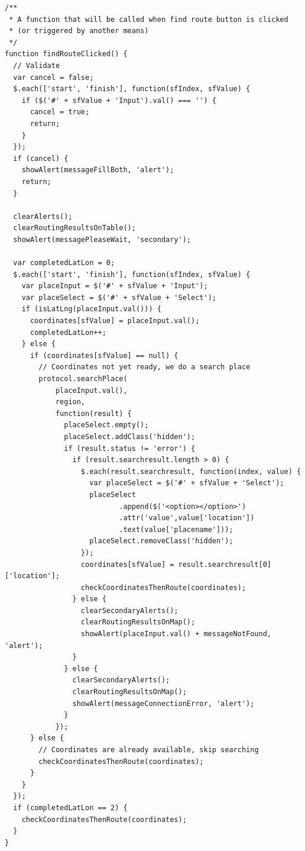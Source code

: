 \documentclass[a4paper,twoside]{article}
\begin{document}
\begin{enumerate}
\begin{lstlisting}[caption=Fungsi JavaScript untuk ketika tombol \textit{find} ditekan,label = {lst_3_php_find_fungsi}]
/**
 * A function that will be called when find route button is clicked
 * (or triggered by another means)
 */
function findRouteClicked() {
  // Validate
  var cancel = false;
  $.each(['start', 'finish'], function(sfIndex, sfValue) {
    if ($('#' + sfValue + 'Input').val() === '') {
      cancel = true;    
      return;
    }
  });
  if (cancel) {
    showAlert(messageFillBoth, 'alert');      
    return;
  }
  
  clearAlerts();
  clearRoutingResultsOnTable();
  showAlert(messagePleaseWait, 'secondary');
  
  var completedLatLon = 0;
  $.each(['start', 'finish'], function(sfIndex, sfValue) {
    var placeInput = $('#' + sfValue + 'Input');
    var placeSelect = $('#' + sfValue + 'Select');
    if (isLatLng(placeInput.val())) {
      coordinates[sfValue] = placeInput.val();
      completedLatLon++;
    } else {
      if (coordinates[sfValue] == null) {
        // Coordinates not yet ready, we do a search place
        protocol.searchPlace(
            placeInput.val(),
            region,
            function(result) {
              placeSelect.empty();
              placeSelect.addClass('hidden');
              if (result.status != 'error') {
                if (result.searchresult.length > 0) {
                  $.each(result.searchresult, function(index, value) {
                    var placeSelect = $('#' + sfValue + 'Select');
                    placeSelect
                           .append($('<option></option>')
                           .attr('value',value['location'])
                           .text(value['placename']));
                    placeSelect.removeClass('hidden');
                  });
                  coordinates[sfValue] = result.searchresult[0]['location'];
                  checkCoordinatesThenRoute(coordinates);
                } else {
                  clearSecondaryAlerts();
                  clearRoutingResultsOnMap();
                  showAlert(placeInput.val() + messageNotFound, 'alert');
                }
              } else {
                clearSecondaryAlerts();
                clearRoutingResultsOnMap();
                showAlert(messageConnectionError, 'alert');
              }
            });
      } else {
        // Coordinates are already available, skip searching
        checkCoordinatesThenRoute(coordinates);
      }
    }
  });
  if (completedLatLon == 2) {
    checkCoordinatesThenRoute(coordinates);
  }
}
\end{lstlisting}


\end{enumerate}
\end{document}
